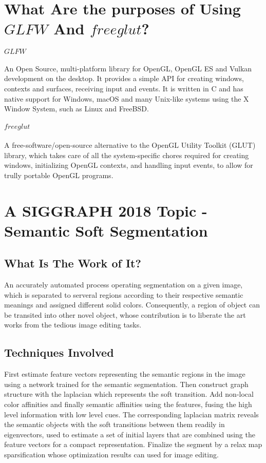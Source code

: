 \documentclass{ctexart}
\begin{document}
\section{What Are the purposes of Using $GLFW$ And $freeglut$?}
\paragraph{$GLFW$} An Open Source, multi-platform library for OpenGL, OpenGL ES and Vulkan development on the desktop. It provides a simple API for creating windows, contexts and surfaces, receiving input and events. It is written in C and has native support for Windows, macOS and many Unix-like systems using the X Window System, such as Linux and FreeBSD.
\paragraph{$freeglut$} A free-software/open-source alternative to the OpenGL Utility Toolkit (GLUT) library, which takes care of all the system-specific chores required for creating windows, initializing OpenGL contexts, and handling input events, to allow for trully portable OpenGL programs.

\section{A SIGGRAPH 2018 Topic - Semantic Soft Segmentation}
\subsection{What Is The Work of It?}
An accurately automated process operating segmentation on a given image, which is separated to serveral regions according to their respective semantic meanings and assigned different solid colors. Consequently, a region of object can be transited into other novel object, whose contribution is to liberate the art works from the tedious image editing tasks.
\subsection{Techniques Involved}
First estimate feature vectors representing the semantic regions in the image using a network trained for the semantic segmentation. Then construct graph structure with the laplacian which represents the soft transition. Add non-local color affinities and finally semantic affinities using the features, fusing the high level information with low level cues. The corresponding laplacian matrix reveals the semantic objects with the soft transitions between them readily in eigenvectors, used to estimate a set of initial layers that are combined using the feature vectors for a compact representation. Finalize the segment by a relax map sparsification whose optimization results can used for image editing.
\end{document}
